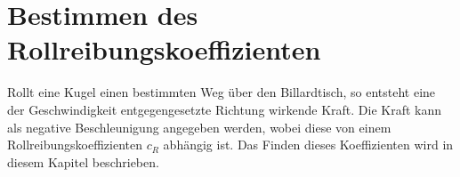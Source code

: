 \section{Bestimmen des Rollreibungskoeffizienten}
Rollt eine Kugel einen bestimmten Weg über den Billardtisch, so entsteht eine der Geschwindigkeit entgegengesetzte
Richtung wirkende Kraft. Die Kraft kann als negative Beschleunigung angegeben werden, wobei diese von einem
Rollreibungskoeffizienten $c_R$ abhängig ist. Das Finden dieses Koeffizienten wird in diesem Kapitel beschrieben.

